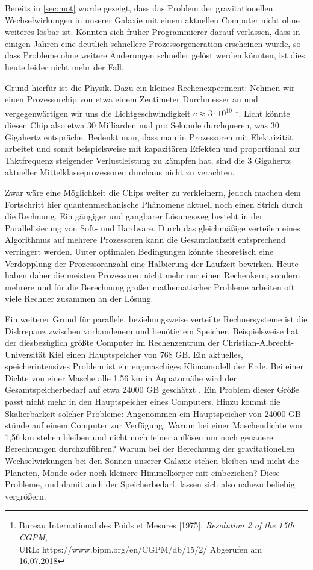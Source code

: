 Bereits in \autoref{sec:mot} wurde gezeigt, dass das Problem der gravitationellen Wechselwirkungen in unserer Galaxie mit einem aktuellen Computer nicht ohne 
    weiteres lösbar ist. 
    Konnten sich früher Programmierer darauf verlassen, dass in einigen Jahren eine deutlich schnellere Prozessorgeneration erscheinen würde, so dass Probleme ohne 
    weitere Änderungen schneller gelöst werden könnten, ist dies heute leider nicht mehr der Fall. 
    
    Grund hierfür ist die Physik. Dazu ein kleines Rechenexperiment: Nehmen wir einen Prozessorchip von etwa einem Zentimeter Durchmesser an und vergegenwärtigen wir 
    uns die Lichtgeschwindigkeit $c \approx 3\cdot10^{10}$ \footnote{Bureau International des Poids et Mesures [1975], \textit{Resolution 2 of the 15th CGPM},\\URL:
    https://www.bipm.org/en/CGPM/db/15/2/ Abgerufen am 16.07.2018}. Licht könnte diesen Chip also etwa 30 Milliarden mal pro Sekunde durchqueren, was 30 Gigahertz
    entspräche. Bedenkt man, dass man in Prozessoren mit Elektrizität arbeitet und somit beispielsweise mit kapazitären Effekten und proportional zur Taktfrequenz steigender
    Verlustleistung zu kämpfen hat, sind die 3 Gigahertz aktueller Mittelklasseprozessoren durchaus nicht zu verachten.
    
    Zwar wäre eine Möglichkeit die Chips weiter zu verkleinern, jedoch machen dem Fortschritt hier quantenmechanische Phänomene aktuell noch einen Strich durch die Rechnung.
    Ein gängiger und gangbarer Lösungsweg besteht in der Parallelisierung von Soft- und Hardware. Durch das gleichmäßige verteilen eines Algorithmus auf mehrere Prozessoren
    kann die Gesamtlaufzeit entsprechend verringert werden. Unter optimalen Bedingungen könnte theoretisch eine Verdopplung der Prozessoranzahl eine Halbierung der Laufzeit
    bewirken. Heute haben daher die meisten Prozessoren nicht mehr nur einen Rechenkern, sondern mehrere und für die Berechnung großer mathematischer Probleme arbeiten oft viele
    Rechner zusammen an der Lösung. \citep{hpcskript}
    
    Ein weiterer Grund für parallele, beziehungsweise verteilte Rechnersysteme ist die Diskrepanz zwischen vorhandenem und benötigtem Speicher. Beispielsweise hat der diesbezüglich größte
    Computer im Rechenzentrum der Christian-Albrecht-Universität Kiel einen Hauptspeicher von 768 GB. Ein aktuelles, speicherintensives Problem ist ein engmaschiges 
    Klimamodell der Erde. Bei einer Dichte von einer Masche alle 1,56 km in Äquatornähe wird der Gesamtspeicherbedarf auf etwa 24000 GB geschätzt \citep{climate}. Ein Problem
    dieser Größe passt nicht mehr in den Hauptspeicher eines Computers.
    Hinzu kommt die Skalierbarkeit solcher Probleme: Angenommen ein Hauptspeicher von 24000 GB stünde auf einem Computer zur Verfügung. Warum bei einer Maschendichte von 
    1,56 km stehen bleiben und nicht noch feiner auflösen um noch genauere Berechnungen durchzuführen?
    Warum bei der Berechnung der gravitationellen Wechselwirkungen bei den Sonnen unserer Galaxie stehen bleiben und nicht die Planeten, Monde oder noch kleinere Himmelkörper mit einbeziehen? 
    Diese Probleme, und damit auch der Speicherbedarf, lassen sich also nahezu beliebig vergrößern.
    
